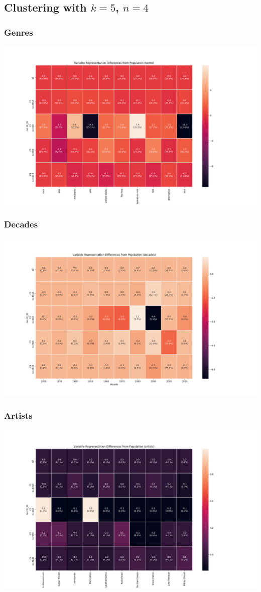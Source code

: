 \subsection{Clustering with $k=5$, $n=4$}
    \subsubsection{Genres}
        \includegraphics[width=1.2\textwidth]{terms_cluster}
    \subsubsection{Decades}
        \includegraphics[width=1.2\textwidth]{decades_cluster}
    \subsubsection{Artists}
        \includegraphics[width=1.2\textwidth]{artists_cluster}
